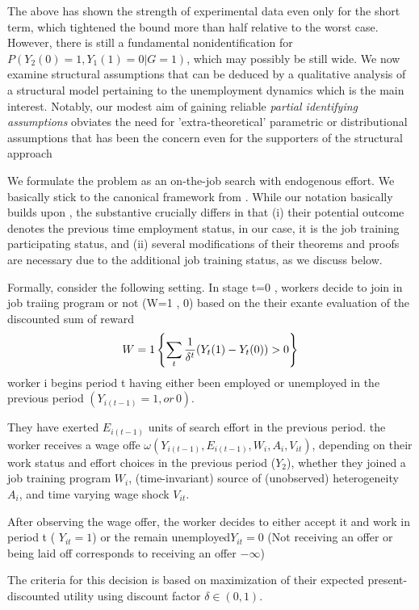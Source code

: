 \documentclass{article}
\begin{document}
The above has shown the strength of experimental data even only for the short term, which tightened the bound more than half relative to the worst case. However, there is still a fundamental nonidentification for $P( Y_2(0) =1, Y_1(1)=0|G=1) $, which may possibly be still wide. We now examine structural assumptions that can be
deduced by a qualitative analysis of a structural model pertaining to the unemployment dynamics which is the main interest. 
Notably, our modest aim of gaining reliable \textit{partial identifying assumptions} obviates the need for 'extra-theoretical' parametric or distributional assumptions that has been the concern even for the supporters of the structural approach\cite{citekeane,todd2020best}

We formulate the problem as an on-the-job search with endogenous effort. We basically stick to the canonical framework from \cite{cite moretensen 1990, faberman et al 2022, togovoretsky 2019}. While our notation basically builds upon \cite{cite togovoretsky 2019} , 
the substantive crucially differs in that (i) their potential outcome denotes the previous time employment status, in our case, it is the job training participating status, and (ii) several modifications of their theorems and proofs are necessary due to the additional job training status, as we discuss below.

Formally, consider the following setting. In stage t=0 , workers decide to join in job traiing program or not (W=1 , 0) based  on the their exante evaluation of the discounted sum of reward 
\[W = 1 \left\{ \sum_t \frac{ 1} { \delta^t }(Y_t( 1) - Y_t(0))  >0\right\} \]
worker i begins period t having
 either been employed or unemployed in the previous period $( Y_{ i (t-1) } =1 , or \,0) $.
 
They have exerted $E_{i (t-1) } $ units of search effort in the previous period. the worker receives a wage offe $ \omega ( Y_{i (t-1) } , E_{ i (t-1) } ,W_i, A_i , V_{it} ) $, depending  on their work status  and effort choices in the previous period ($Y_2$), whether they joined a job training program $W_i$, 
(time-invariant) source of (unobserved) heterogeneity $ A_i$, and time varying wage shock $V_{it}$. 

After observing the wage offer, the worker decides to either accept it and work in period t ( $Y_{it} =1$) or the remain unemployed$ Y_{it} =0 $ (Not receiving an offer or being laid off corresponds to receiving an offer $  - \infty$)

The criteria for this decision is based on maximization of their expected present-discounted utility using discount factor $\delta \in (0,1)$.
\end{document}
